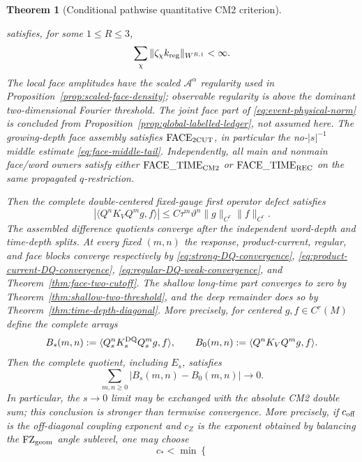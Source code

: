 \documentclass[11pt]{article}
\newtheorem{theorem}{Theorem}[section]
\begin{document}
\begin{theorem}[Conditional pathwise quantitative CM2 criterion]
\begin{enumerate}[label=\textup{(H\arabic*)}]
      satisfies, for some
      $1\le R\le3$,
      \[
       \sum_\chi\|\zeta_\chi k_{\rm reg}\|_{W^{R,1}}<\infty.
      \]
      The local face amplitudes have the scaled
      $\mathcal A^\alpha$ regularity used in
      Proposition~\ref{prop:scaled-face-density}; observable regularity is
      above the dominant two-dimensional Fourier threshold.  The joint face
      part of \eqref{eq:event-physical-norm} is concluded from
      Proposition~\ref{prop:global-labelled-ledger}, not assumed here.
      The growing-depth face assembly satisfies
      $\mathrm{FACE}_{\rm 2CUT}$, in particular the no-$|s|^{-1}$ middle
      estimate \eqref{eq:face-middle-tail}.  Independently, all main and
      nonmain face/word owners satisfy
      either $\mathrm{FACE\_TIME}_{\rm CM2}$ or
      $\mathrm{FACE\_TIME}_{\rm REC}$ on the same propagated
      $q$-restriction.
\end{enumerate}
Then the complete double-centered fixed-gauge first operator defect satisfies
\[
 |\langle Q^nK_VQ^mg,f\rangle|
 \le C\tau^m\vartheta^n\|g\|_{C^r}\|f\|_{C^r}.
\]
The assembled difference quotients converge after the independent word-depth
and time-depth splits.  At every fixed $(m,n)$ the response,
product-current, regular, and face blocks converge respectively by
\eqref{eq:strong-DQ-convergence},
\eqref{eq:product-current-DQ-convergence},
\eqref{eq:regular-DQ-weak-convergence}, and
Theorem~\ref{thm:face-two-cutoff}.  The shallow long-time part converges to zero by
Theorem~\ref{thm:shallow-two-threshold}, and the deep remainder does so by
Theorem~\ref{thm:time-depth-diagonal}.  More precisely, for centered
$g,f\in C^r(M)$ define the complete arrays
\begin{equation}
\label{eq:complete-CM2-DQ-arrays}
 B_s(m,n):=\langle Q_s^nK_s^{\rm DQ}Q_s^mg,f\rangle,
 \qquad
 B_0(m,n):=\langle Q^nK_VQ^mg,f\rangle .
\end{equation}
Then the complete quotient, including $E_s$, satisfies
\begin{equation}
\label{eq:complete-CM2-l1-convergence}
 \sum_{m,n\ge0}|B_s(m,n)-B_0(m,n)|\longrightarrow0.
\end{equation}
In particular, the $s\to0$ limit may be exchanged with the absolute CM2
double sum; this conclusion is stronger than termwise convergence.  More
precisely, if $c_{\rm off}$ is the off-diagonal coupling exponent and $c_Z$
is the exponent obtained by balancing the $\mathrm{FZ}_{\rm geom}$ angle sublevel, one
may choose
\begin{equation}
\label{eq:final-CM2-exponent}
 c_*<\min\left\{

\end{equation}
\end{theorem}
\end{document}
